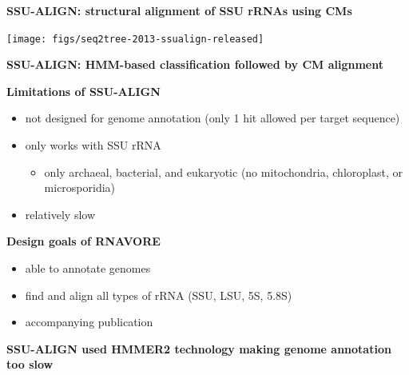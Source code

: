 \documentclass[landscape]{slides}
\begin{document}
\begin{slide}
\begin{center}
\textbf{SSU-ALIGN: structural alignment of SSU rRNAs using CMs}
\end{center}

\texttt{[image: figs/seq2tree-2013-ssualign-released]}

\vfill
\end{slide}
\begin{slide}
\begin{center}
\small
\textbf{SSU-ALIGN: HMM-based classification followed by CM alignment}
\end{center}


\vfill
\end{slide}
\begin{slide}
\begin{center}
\textbf{Limitations of SSU-ALIGN}
\end{center}

\small
\begin{itemize}
\item 
not designed for genome annotation (only 1 hit allowed per target
sequence)
\item 
only works with SSU rRNA 
\begin{itemize}
  \item only archaeal, bacterial, and eukaryotic (no mitochondria, chloroplast, or microsporidia)
\end{itemize}
\item 
relatively slow
\end{itemize}

\normalsize
\begin{center}
\textbf{Design goals of RNAVORE}
\end{center}

\small
\begin{itemize}
\item 
able to annotate genomes
\item 
find and align all types of rRNA (SSU, LSU, 5S, 5.8S)
\item 
accompanying publication
\end{itemize}

\vfill
\begin{slide}
\begin{center}
\small
\textbf{SSU-ALIGN used HMMER2 technology making genome annotation too slow}
\end{center}


\vfill
\end{slide}
\end{slide}
\end{document}
